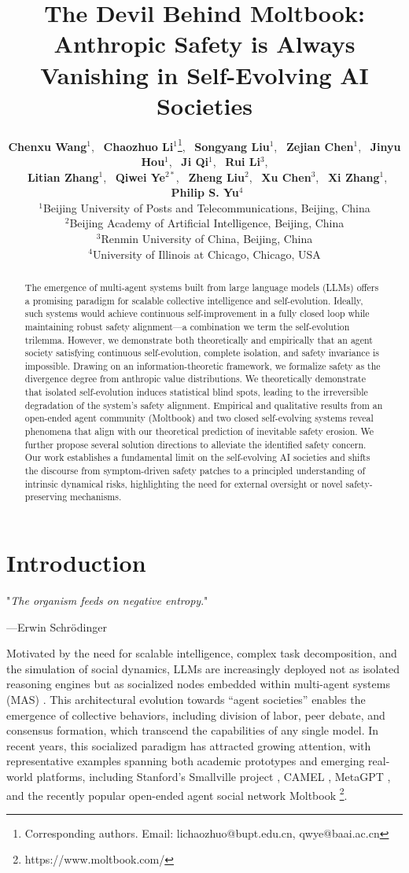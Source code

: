 \documentclass{article}
\title{The Devil Behind Moltbook: Anthropic Safety is Always Vanishing in Self-Evolving AI Societies}
\author{
\textbf{Chenxu Wang}$^{1}$,
~\textbf{Chaozhuo Li}$^{1}$\thanks{Corresponding authors. Email: lichaozhuo@bupt.edu.cn, qwye@baai.ac.cn},
~\textbf{Songyang Liu}$^{1}$,
~\textbf{Zejian Chen}$^{1}$,
~\textbf{Jinyu Hou}$^{1}$,
~\textbf{Ji Qi}$^{1}$, 
~\textbf{Rui Li}$^{3}$, \\
~\textbf{Litian Zhang}$^{1}$,
~\textbf{Qiwei Ye}$^{2*}$,
~\textbf{Zheng Liu}$^{2}$,
~\textbf{Xu Chen}$^{3}$,
~\textbf{Xi Zhang}$^{1}$,
~\textbf{Philip S. Yu}$^{4}$
\\
\small $^{1}$Beijing University of Posts and Telecommunications, Beijing, China \\
\small $^{2}$Beijing Academy of Artificial Intelligence, Beijing, China \\
\small $^{3}$Renmin University of China, Beijing, China \\
\small $^{4}$University of Illinois at Chicago, Chicago, USA \\
}
\theoremstyle{definition}
\theoremstyle{plain}
\begin{document}
\maketitle


\begin{abstract}
The emergence of multi-agent systems built from large language models (LLMs) offers a promising paradigm for scalable collective intelligence and self-evolution. 
Ideally, such systems would achieve continuous self-improvement in a fully closed loop while maintaining robust safety alignment—a combination we term the self-evolution trilemma. 
However, we demonstrate both theoretically and empirically that an agent society satisfying continuous self-evolution, complete isolation, and safety invariance is impossible. 
Drawing on an information-theoretic framework, we formalize safety as the divergence degree from anthropic value distributions. 
We theoretically demonstrate that isolated self-evolution induces statistical blind spots, leading to the irreversible degradation of the system's safety alignment.
Empirical and qualitative results from an open-ended agent community (Moltbook) and two closed self-evolving systems reveal phenomena that align with our theoretical prediction of inevitable safety erosion. 
We further propose several solution directions to alleviate the identified safety concern. 
Our work establishes a fundamental limit on the self-evolving AI societies and shifts the discourse from symptom-driven safety patches to a principled understanding of intrinsic dynamical risks, highlighting the need for external oversight or novel safety-preserving mechanisms.
\end{abstract}

\section{Introduction}

\epigraph{"\textit{The organism feeds on negative entropy}."}{---Erwin Schrödinger} 
Motivated by the need for scalable intelligence, complex task decomposition, and the simulation of social dynamics, LLMs are increasingly deployed not as isolated reasoning engines but as socialized nodes embedded within multi-agent systems (MAS) \cite{li2024survey}.  
This architectural evolution towards ``agent societies'' enables the emergence of collective behaviors, including division of labor, peer debate, and consensus formation, which transcend the capabilities of any single model. 
In recent years, this socialized paradigm has attracted growing attention, with representative examples spanning both academic prototypes and emerging real-world platforms, including Stanford’s Smallville project \cite{park2023generative}, CAMEL \cite{li2023camel}, MetaGPT \cite{hong2023metagpt}, and the recently popular open-ended agent social network Moltbook \footnote{https://www.moltbook.com/}.
\end{document}
